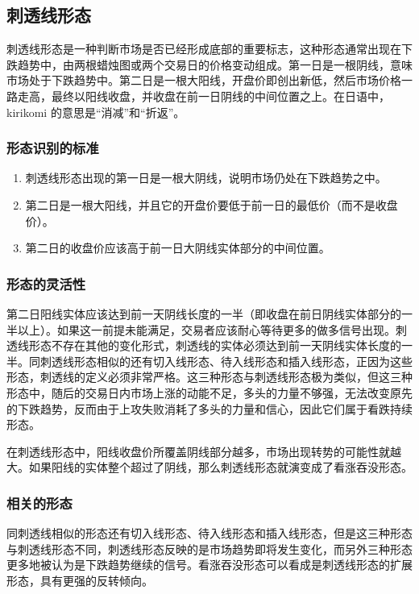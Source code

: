 \subsection{刺透线形态}
刺透线形态是一种判断市场是否已经形成底部的重要标志，这种形态通常出现在下跌趋势中，由两根蜡烛图或两个交易日的价格变动组成。第一日是一根阴线，意味市场处于下跌趋势中。第二日是一根大阳线，开盘价即创出新低，然后市场价格一路走高，最终以阳线收盘，并收盘在前一日阴线的中间位置之上。在日语中，kirikomi 的意思是“消减”和“折返”。
\subsubsection*{形态识别的标准}
\begin{enumerate}
    \item 刺透线形态出现的第一日是一根大阴线，说明市场仍处在下跌趋势之中。
    \item 第二日是一根大阳线，并且它的开盘价要低于前一日的最低价（而不是收盘价）。
    \item 第二日的收盘价应该高于前一日大阴线实体部分的中间位置。
\end{enumerate}
\subsubsection*{形态的灵活性}
第二日阳线实体应该达到前一天阴线长度的一半（即收盘在前日阴线实体部分的一半以上）。如果这一前提未能满足，交易者应该耐心等待更多的做多信号出现。刺透线形态不存在其他的变化形式，刺透线的实体必须达到前一天阴线实体长度的一半。同刺透线形态相似的还有切入线形态、待入线形态和插入线形态，正因为这些形态，刺透线的定义必须非常严格。这三种形态与刺透线形态极为类似，但这三种形态中，随后的交易日内市场上涨的动能不足，多头的力量不够强，无法改变原先的下跌趋势，反而由于上攻失败消耗了多头的力量和信心，因此它们属于看跌持续形态。

在刺透线形态中，阳线收盘价所覆盖阴线部分越多，市场出现转势的可能性就越大。如果阳线的实体整个超过了阴线，那么刺透线形态就演变成了看涨吞没形态。

\subsubsection*{相关的形态}
同刺透线相似的形态还有切入线形态、待入线形态和插入线形态，但是这三种形态与刺透线形态不同，刺透线形态反映的是市场趋势即将发生变化，而另外三种形态更多地被认为是下跌趋势继续的信号。看涨吞没形态可以看成是刺透线形态的扩展形态，具有更强的反转倾向。
